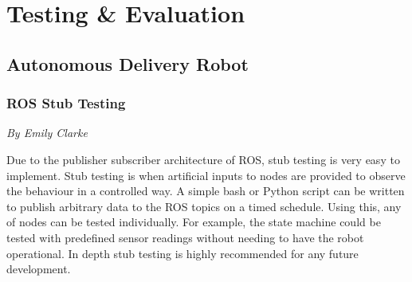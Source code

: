 \documentclass[12pt]{report}
\newcommand{\sectionAuthor}[1]{{\small\vspace{-1em}\textit{#1}}\bigskip\par}
\begin{document}


\chapter{Testing \& Evaluation}
\section{Autonomous Delivery Robot}
\subsection{ROS Stub Testing}
\sectionAuthor{By Emily Clarke}
Due to the publisher subscriber architecture of ROS, stub testing is very easy to implement. Stub testing is when artificial inputs to nodes are provided to observe the behaviour in a controlled way. A simple bash or Python script can be written to publish arbitrary data to the ROS topics on a timed schedule. Using this, any of nodes can be tested individually. For example, the state machine could be tested with predefined sensor readings without needing to have the robot operational. In depth stub testing is highly recommended for any future development.
\end{document}
